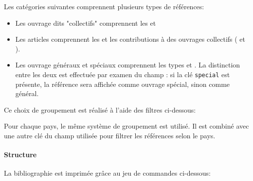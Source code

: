 \documentclass{ltxdockit}
\begin{document}
Les catégories suivantes comprennent plusieurs types de références:
\begin{itemize}
\item Les ouvrage dits "collectifs" comprennent les  et 
\item Les articles comprennent les  et les contributions à des ouvrages collectifs ( et ).
\item Les ouvrage généraux et spéciaux comprennent les types  et . La distinction entre les deux est effectuée par examen du champ : si la clé \texttt{special} est présente, la référence sera affichée comme ouvrage spécial, sinon comme général.
\end{itemize}

Ce choix de groupement est réalisé à l'aide des filtres ci-dessous:
\begin{ltxexample}
\end{ltxexample}
%

Pour chaque pays, le même système de groupement est utilisé. Il est combiné avec une autre clé du champ  utilisée pour filtrer les références selon le pays.

\paragraph{Structure}

La bibliographie est imprimée grâce au jeu de commandes ci-dessous:
\end{document}
